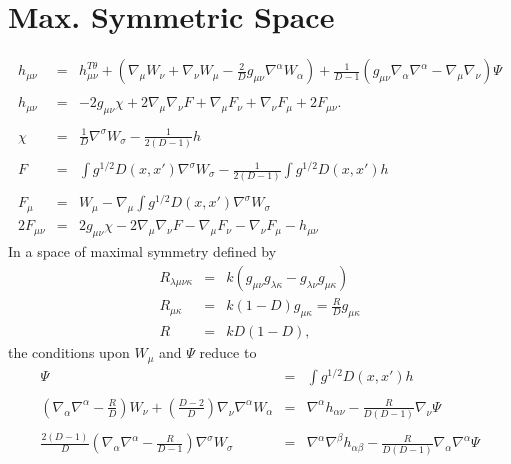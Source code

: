 \documentclass[10pt,letterpaper]{article}
\numberwithin{equation}{section}
\begin{document}
\section{Max. Symmetric Space}
\begin{eqnarray}
h_{\mu\nu} &=& h_{\mu\nu}^{T\theta} + \left(\nabla_\mu W_\nu + \nabla_\nu W_\mu - \frac{2}{D}g_{\mu\nu}\nabla^\alpha W_\alpha\right) +\frac{1}{D-1}\left( g_{\mu\nu}\nabla_\alpha \nabla^\alpha - \nabla_\mu\nabla_\nu\right)\Psi
\\  \nonumber\\
h_{\mu\nu} &=& -2g_{\mu\nu}\chi + 2\nabla_\mu\nabla_\nu F + \nabla_\mu F_\nu + \nabla_\nu F_\mu + 2F_{\mu\nu}.
\\ \nonumber\\
\chi &=& \frac{1}{D}\nabla^\sigma W_{\sigma}  - \frac{1}{2(D-1)}h
\\ \nonumber\\
F &=& \int g^{1/2} D(x,x') \nabla^\sigma W_{\sigma}  - \frac{1}{2(D-1)}\int g^{1/2} D(x,x') h
\\ \nonumber\\
F_{\mu} &=& W_{\mu} -\nabla_\mu \int g^{1/2} D(x,x')\nabla^{\sigma}W_\sigma
\nonumber\\
2F_{\mu\nu} &=& 2g_{\mu\nu}\chi - 2\nabla_\mu\nabla_\nu F - \nabla_\mu F_\nu - \nabla_\nu F_{\mu} - h_{\mu\nu} 
\end{eqnarray}
In a space of maximal symmetry defined by
\begin{eqnarray}
R_{\lambda\mu\nu\kappa} &=& k(g_{\mu\nu}g_{\lambda\kappa}-g_{\lambda\nu}g_{\mu\kappa})
\nonumber\\
R_{\mu\kappa} &=& k(1-D)g_{\mu\kappa} = \frac{R}{D}g_{\mu\kappa}
\nonumber\\
R&=& kD(1-D), 
\end{eqnarray}
the conditions upon $W_\mu$ and $\Psi$ reduce to
\begin{eqnarray}
\Psi &=& \int g^{1/2} D(x,x') h
\\ \nonumber \\
\left(\nabla_\alpha\nabla^\alpha-\frac{R}{D}\right) W_\nu + \left(\frac{D-2}{D}\right)\nabla_\nu \nabla^\alpha W_\alpha  &=&
\nabla^\alpha h_{\alpha\nu} - \frac{R}{D(D-1)}\nabla_\nu \Psi
\label{maxsymcon1}
\\ \nonumber\\
\frac{2(D-1)}{D}\left( \nabla_\alpha\nabla^\alpha -\frac{R}{D-1}\right) \nabla^\sigma W_\sigma &=& 
\nabla^\alpha\nabla^\beta h_{\alpha\beta}  - \frac{R}{D(D-1)}\nabla_\alpha \nabla^\alpha \Psi
\label{maxsymcon4}
\end{eqnarray}
\end{document}
